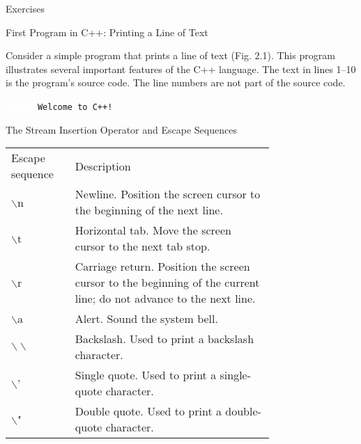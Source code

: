\documentclass[10pt]{beamer}
\begin{document}
\begin{frame}{Exercises}
	\lipsum[2]
\end{frame}

\begin{frame}{\small First Program in C++: Printing a Line of Text}
	
	Consider a simple program that prints a line of text (Fig. 2.1). This program illustrates several important features of the C++ language. The text in lines 1–10 is the program’s source code. The line numbers are not part of the source code.
	
	
	
	\begin{block}{\textcolor{white}{output}}
		\texttt{\small Welcome to C++!}
	\end{block}
	
\end{frame}


\begin{frame}{\small The Stream Insertion Operator and Escape Sequences}
	\centering\tiny\renewcommand{\arraystretch}{2}	
\begin{tabular}{p{0.15\linewidth} p{0.6\linewidth}}
	\rowcolor{cyan}\color{white} Escape sequence & \color{white} Description \\
	
	\rowcolor{lightcyan} $\backslash$n & Newline. Position the screen cursor to the beginning of the next line.\\ 
	
	\rowcolor{lightcyan} $\backslash$t & Horizontal tab. Move the screen cursor to the next tab stop.\\ 
	
	\rowcolor{lightcyan} $\backslash$r & Carriage return. Position the screen cursor to the beginning of the current line; do not advance to the next line.\\ 
	
	\rowcolor{lightcyan} $\backslash$a & Alert. Sound the system bell.\\ 
	
	\rowcolor{lightcyan} $\backslash\backslash$ & Backslash. Used to print a backslash character.\\ 
	
	\rowcolor{lightcyan} $\backslash$' & Single quote. Used to print a single-quote character.\\ 
	
	\rowcolor{lightcyan} $\backslash$" & Double quote. Used to print a double-quote character.
\end{tabular}
\end{frame}
\end{document}
